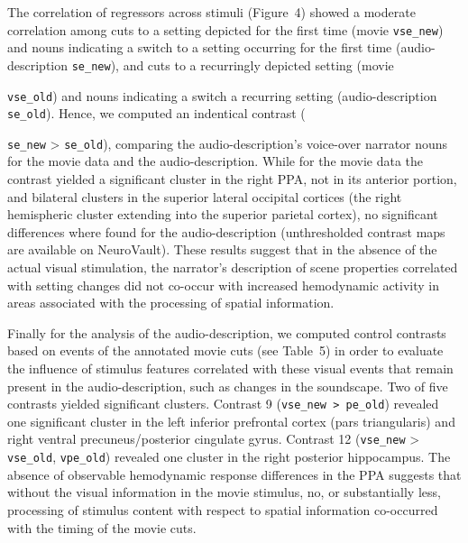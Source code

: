 \documentclass[english,11pt]{article}
\begin{document}
The correlation of regressors across stimuli (Figure~4) showed
a moderate correlation among cuts to a setting depicted for the first time
(movie \texttt{vse\_new}) and nouns indicating a switch to a setting occurring
for the first time (audio-description \texttt{se\_new}), and cuts to a
recurringly depicted setting (movie {\texttt{vse\_old}) and nouns indicating a
switch a recurring setting (audio-description \texttt{se\_old}).
%
Hence, we computed an indentical contrast ({\texttt{se\_new} >
\texttt{se\_old}), comparing the audio-description's voice-over narrator nouns
for the movie data and the audio-description.
While for the movie data the contrast yielded a significant cluster in the right
PPA, not in its anterior portion, and bilateral clusters in the superior lateral
occipital cortices (the right hemispheric cluster extending into the superior
parietal cortex), no significant differences where found for the
audio-description (unthresholded contrast maps are available on NeuroVault).
%
These results suggest that in the absence of the actual visual stimulation, the
narrator's description of scene properties correlated with setting changes did
not co-occur with increased hemodynamic activity in areas associated with the
processing of spatial information.

Finally for the analysis of the audio-description, we computed control contrasts
based on events of the annotated movie cuts (see Table~5) in order
to evaluate the influence of stimulus features correlated with these visual
events that remain present in the audio-description, such as changes in the
soundscape.
Two of five contrasts yielded significant clusters.
Contrast 9 (\texttt{vse\_new > pe\_old}) revealed one significant cluster in the
left inferior prefrontal cortex (pars triangularis) and right ventral
precuneus/posterior cingulate gyrus.
Contrast 12 (\texttt{vse\_new} > \texttt{vse\_old}, \texttt{vpe\_old}) revealed
one cluster in the right posterior hippocampus.
%
The absence of observable hemodynamic response differences in the PPA suggests
that without the visual information in the movie stimulus, no, or substantially
less, processing of stimulus content with respect to spatial information
co-occurred with the timing of the movie cuts.


{\small
}

}}
\end{document}
